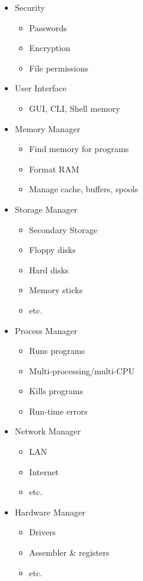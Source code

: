\documentclass[12 pt]{article}
\begin{document}
	\begin{itemize}
		\item Security 
		\begin{itemize}
			\item Passwords
			\item Encryption
			\item File permissions
		\end{itemize}
		\item User Interface
		\begin{itemize}
			\item GUI, CLI, Shell memory
		\end{itemize}
		\item Memory Manager
		\begin{itemize}
			\item Find memory for programs
			\item Format RAM
			\item Manage cache, buffers, spools
		\end{itemize}
		\item Storage Manager
		\begin{itemize}
			\item Secondary Storage
			\item Floppy disks
			\item Hard disks
			\item Memory sticks
			\item etc.
		\end{itemize}
		\item Process Manager
		\begin{itemize}
			\item Runs programs
			\item Multi-processing/multi-CPU
			\item Kills programs
			\item Run-time errors
		\end{itemize}
		\item Network Manager
		\begin{itemize}
			\item LAN
			\item Internet
			\item etc.
		\end{itemize}
		\item Hardware Manager
		\begin{itemize}
			\item Drivers
			\item Assembler \& registers
			\item etc.
		\end{itemize}
	\end{itemize}
\end{document}
